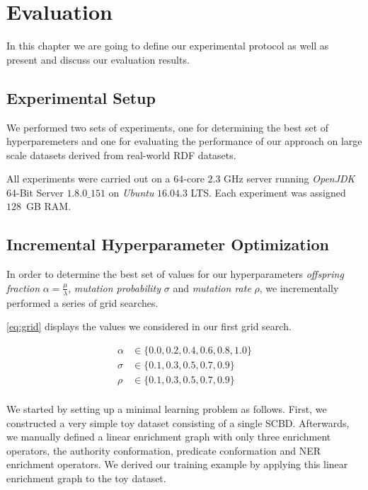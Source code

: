 \chapter{Evaluation}
\label{ch:eval}
In this chapter we are going to define our experimental protocol as well as present and discuss our evaluation results.
\section{Experimental Setup}
\label{sec:experimentalsetup}
We performed two sets of experiments, one for determining the best set of hyperparemeters and one for evaluating the performance of our approach on large scale datasets derived from real-world \ac{RDF} datasets.

All experiments were carried out on a $64$-core $2.3$ GHz server running \emph{OpenJDK} 64-Bit Server $1.8.0\_151$ on \emph{Ubuntu} $16.04.3$ LTS. 
Each experiment was assigned $128$~GB RAM.



\section{Incremental Hyperparameter Optimization}
In order to determine the best set of values for our hyperparameters \emph{offspring fraction} $\alpha=\frac{\mu}{\lambda}$, \emph{mutation probability} $\sigma$ and \emph{mutation rate} $\rho$, we incrementally performed a series of grid searches.

\autoref{eq:grid} displays the values we considered in our first grid search.

\begin{equation}
  \begin{aligned}
    \alpha & \in \{0.0, 0.2, 0.4, 0.6, 0.8, 1.0\} \\
    \sigma & \in \{0.1, 0.3, 0.5, 0.7, 0.9\} \\
    \rho & \in \{0.1, 0.3, 0.5, 0.7, 0.9\} \\
  \end{aligned}
  \label{eq:grid}
\end{equation}

We started by setting up a minimal learning problem as follows.
First, we constructed a very simple toy dataset consisting of a single \ac{SCBD}.
Afterwards, we manually defined a linear enrichment graph with only three enrichment operators, the authority conformation, predicate conformation and \ac{NER} enrichment operators.
We derived our training example by applying this linear enrichment graph to the toy dataset.\\

